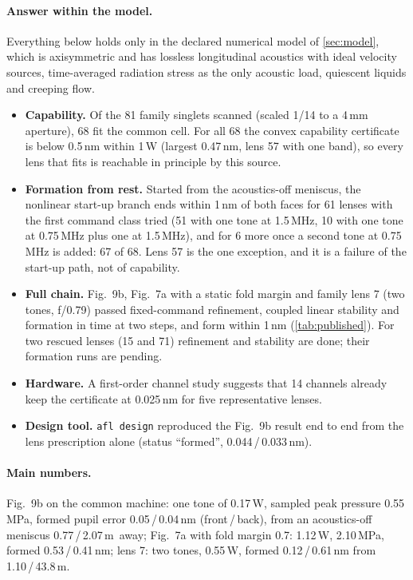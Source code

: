 \documentclass[11pt,a4paper]{article}
\numberwithin{equation}{section}
\newcommand{\um}{\,\textmu m}
\begin{document}
\paragraph{Answer within the model.} Everything below holds only in the declared
numerical model of \cref{sec:model}, which is axisymmetric and has lossless longitudinal acoustics
with ideal velocity sources, time-averaged radiation stress as the only acoustic
load, quiescent liquids and creeping flow.
\begin{itemize}
\item \textbf{Capability.} Of the 81 family singlets scanned (scaled 1/14 to a
4\,mm aperture), 68 fit the common cell. For all 68 the convex capability
certificate is below 0.5\,nm within 1\,W (largest 0.47\,nm, lens 57 with one
band), so every lens that fits is reachable in principle by this source.
\item \textbf{Formation from rest.} Started from the acoustics-off meniscus, the
nonlinear start-up branch ends within 1\,nm of both faces for 61 lenses with the
first command class tried (51 with one tone at 1.5\,MHz, 10 with one tone at
0.75\,MHz plus one at 1.5\,MHz), and for 6 more once a second tone at 0.75\,MHz
is added: 67 of 68. Lens 57 is the one exception, and it is a failure of the
start-up path, not of capability.
\item \textbf{Full chain.} Fig.~9b, Fig.~7a with a static fold margin and family
lens 7 (two tones, f/0.79) passed fixed-command refinement, coupled linear
stability and formation in time at two steps, and form within 1\,nm
(\cref{tab:published}). For two rescued lenses (15 and 71) refinement and
stability are done; their formation runs are pending.
\item \textbf{Hardware.} A first-order channel study suggests that 14 channels
already keep the certificate at 0.025\,nm for five representative lenses.
\item \textbf{Design tool.} \texttt{afl design} reproduced the Fig.~9b result end
to end from the lens prescription alone (status \enquote{formed},
0.044\,/\,0.033\,nm).
\end{itemize}

\paragraph{Main numbers.} Fig.~9b on the common machine: one tone of 0.17\,W,
sampled peak pressure 0.55\,MPa, formed pupil error 0.05\,/\,0.04\,nm
(front\,/\,back), from an acoustics-off meniscus 0.77\,/\,2.07\um\ away; Fig.~7a
with fold margin 0.7: 1.12\,W, 2.10\,MPa, formed 0.53\,/\,0.41\,nm; lens 7: two
tones, 0.55\,W, formed 0.12\,/\,0.61\,nm from 1.10\,/\,43.8\um.
\end{document}
